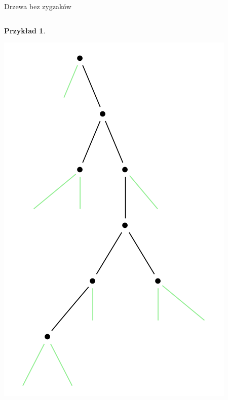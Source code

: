 \documentclass[final]{beamer}
\theoremstyle{bluetheorem}
\theoremstyle{bluetheorem}
\theoremstyle{greentheorem}
\newtheorem{myexample}[mytheorem]{Przykład}
\begin{document}
\begin{frame}{Drzewa bez zygzaków}
\begin{columns}
        \begin{myexample}
            \begin{center}
                \includegraphics{zigzag_001.png}
            \end{center}
        \end{myexample}
    \end{columns}
\end{frame}
\end{document}

